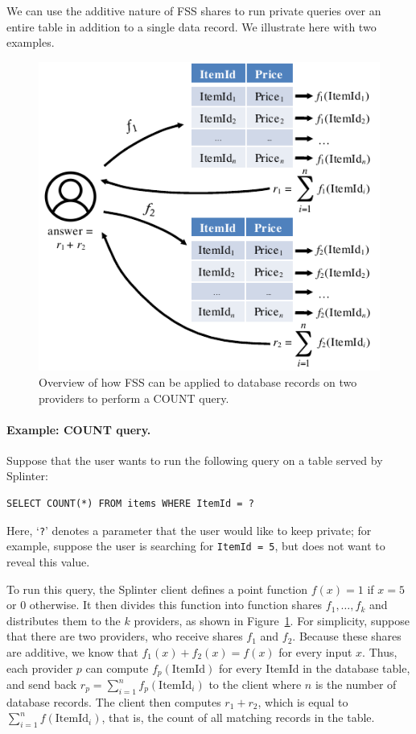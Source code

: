 We can use the additive nature of FSS shares to run private queries over
an entire table in addition to a single data record.
We illustrate here with two examples.

\begin{figure}
	\centering
	\includegraphics[width=\textwidth]{splinter-figs/fss.pdf}
	\caption{Overview of how FSS can be applied to database records
		on two providers to perform a COUNT query.}
	\label{fig:fss_overview}
\end{figure}


\paragraph{Example: COUNT query.}
Suppose that the user wants to run the following query on
a table served by Splinter:
\begin{verbatim}
SELECT COUNT(*) FROM items WHERE ItemId = ?
\end{verbatim}

Here, `\texttt{?}' denotes a parameter that the user would like to keep
private; for example, suppose the user is searching for \texttt{ItemId = 5},
but does not want to reveal this value.

To run this query, the Splinter client defines a point function $f(x)=1$ if $x=5$
or 0 otherwise.
It then divides this function into function shares $f_1,\dots,f_k$ and
distributes them to the $k$ providers, as shown in Figure~\ref{fig:fss_overview}.
For simplicity, suppose that there are two providers, who receive shares
$f_1$ and $f_2$.
Because these shares are additive, we know that $f_1(x)+f_2(x)=f(x)$
for every input $x$.
Thus, each provider $p$ can compute $f_p(\mathrm{ItemId})$ for every ItemId in the
database table, and send back $r_p = \sum_{i=1}^n f_p(\mathrm{ItemId}_i)$
to the client where $n$ is the number of database records.
The client then computes $r_1 + r_2$, which is equal
to $\sum_{i=1}^n f(\mathrm{ItemId}_i)$, that is, the count of all matching
records in the table.

